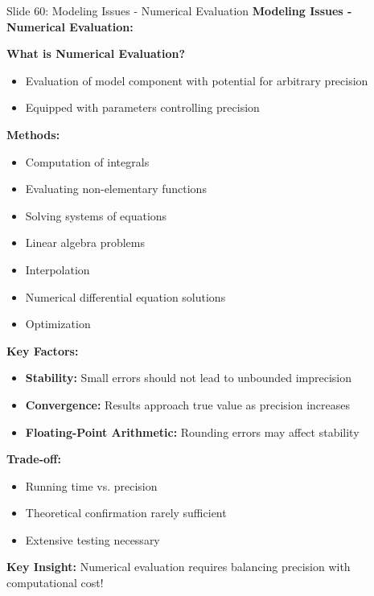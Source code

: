 \documentclass[8pt]{beamer}
\begin{document}
	\begin{frame}{Slide 60: Modeling Issues - Numerical Evaluation}
		\fontsize{6.5}{7.5}\selectfont
		\textbf{Modeling Issues - Numerical Evaluation:}
		
		\vspace{0.1cm}
		\textbf{What is Numerical Evaluation?}
		\begin{itemize}
			\item Evaluation of model component with potential for arbitrary precision
			\item Equipped with parameters controlling precision
		\end{itemize}
		
		\vspace{0.1cm}
		\textbf{Methods:}
		\begin{itemize}
			\item Computation of integrals
			\item Evaluating non-elementary functions
			\item Solving systems of equations
			\item Linear algebra problems
			\item Interpolation
			\item Numerical differential equation solutions
			\item Optimization
		\end{itemize}
		
		\vspace{0.1cm}
		\textbf{Key Factors:}
		\begin{itemize}
			\item \textbf{Stability:} Small errors should not lead to unbounded imprecision
			\item \textbf{Convergence:} Results approach true value as precision increases
			\item \textbf{Floating-Point Arithmetic:} Rounding errors may affect stability
		\end{itemize}
		
		\vspace{0.1cm}
		\textbf{Trade-off:}
		\begin{itemize}
			\item Running time vs. precision
			\item Theoretical confirmation rarely sufficient
			\item Extensive testing necessary
		\end{itemize}
		
		\textcolor{myblue}{\textbf{Key Insight:}} Numerical evaluation requires \textcolor{myblue}{balancing precision with computational cost}!
	\end{frame}
	
\end{document}
